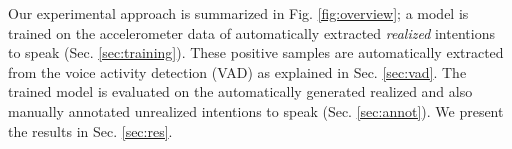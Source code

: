 \documentclass[manuscript,screen,review]{acmart}
\begin{document}
% 

Our experimental approach is summarized in Fig. \ref{fig:overview}; a model is trained on the accelerometer data of automatically extracted \emph{realized} intentions to speak (Sec. \ref{sec:training}). These positive samples are automatically extracted from the voice activity detection (VAD) as explained in Sec. \ref{sec:vad}. The trained model is evaluated on the automatically generated realized and also manually annotated unrealized intentions to speak (Sec. \ref{sec:annot}). We present the results in Sec. \ref{sec:res}.




\end{document}
